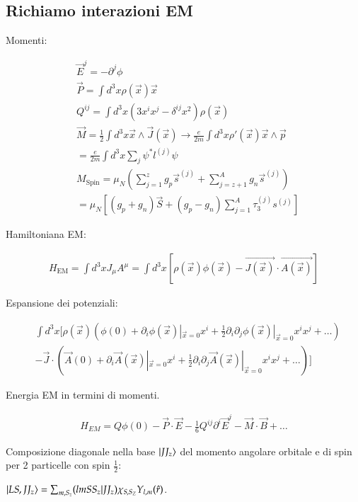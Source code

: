 \documentclass[main.tex]{subfiles}
\begin{document}
\subsection{Richiamo interazioni EM}

Momenti:

\begin{align*}
&\vec{E}^j=-\partial^j\phi\\
&\vec{P}=\int d^3x\rho(\vec{x})\vec{x}\\
&Q^{ij}=\int d^3x(3x^ix^j-\delta^{ij}x^2)\rho(\vec{x})\\
&\vec{M}=\frac{1}{2}\int d^3x\vec{x}\wedge\vec{J}(\vec{x})\rightarrow\frac{e}{2m}\int d^3x\rho'(\vec{x})\vec{x}\wedge\vec{p}\\
&=\frac{e}{2m}\int d^3x\sum_j\psi^*l^{(j)}\psi\\
&M_{\text{Spin}}=\mu_N(\sum_{j=1}^zg_p\vec{s}^{(j)}+\sum_{j=z+1}^Ag_n\vec{s}^{(j)})\\
&=\mu_N[(g_p+g_n)\vec{S}+(g_p-g_n)\sum_{j=1}^A\tau_3^{(j)}s^{(j)}]
\end{align*}

Hamiltoniana EM:

\begin{align*}
H_{\text{EM}}=\int d^3xJ_{\mu}A^{\mu}=\int d^3x[\rho(\vec{x})\phi(\vec{x})-\vec{J(\vec{x})}\cdot\vec{A(\vec{x})}]
\end{align*}

Espansione dei potenziali:

\begin{align*}
&\int d^3x[\rho(\vec{x})(\phi(0)+\partial_i\phi(\vec{x})|_{\vec{x}=0}x^i+\frac{1}{2}\partial_i\partial_j\phi(\vec{x})|_{\vec{x}=0}x^ix^j+\ldots)\\
&-\vec{J}\cdot(\vec{A}(0)+\partial_i\vec{A}(\vec{x})|_{\vec{x}=0}x^i+\frac{1}{2}\partial_i\partial_j\vec{A}(\vec{x})|_{\vec{x}=0}x^ix^j+\ldots)]
\end{align*}

Energia EM in termini di momenti.

\begin{align*}
H_{EM}=Q\phi(0)-\vec{P}\cdot\vec{E}-\frac{1}{6}Q^{ij}\partial^i\vec{E}^j-\vec{M}\cdot\vec{B}+\ldots
\end{align*}

Composizione diagonale nella base $\ket{JJ_z}$ del momento angolare orbitale e di spin per 2 particelle con spin $\frac{1}{2}$:

$\ket{LS,JJ_z}=\sum_{m,S_z}(lmSS_z|JJ_z)\chi_{S,S_Z}Y_{l,m}(\hat{r})$.
\end{document}
